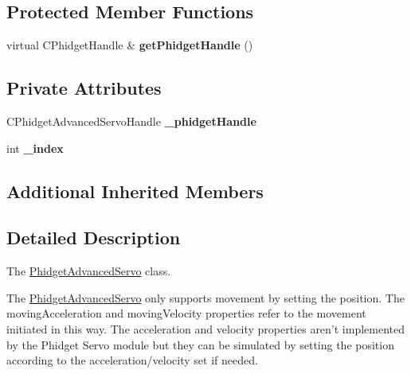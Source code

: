 \subsection*{Protected Member Functions}
\begin{DoxyCompactItemize}
\item 
\hypertarget{classdrobot_1_1device_1_1actuator_1_1PhidgetAdvancedServo_acdbdef2906b308868745f1d5d12559a2}{virtual C\-Phidget\-Handle \& {\bfseries get\-Phidget\-Handle} ()}\label{classdrobot_1_1device_1_1actuator_1_1PhidgetAdvancedServo_acdbdef2906b308868745f1d5d12559a2}

\end{DoxyCompactItemize}
\subsection*{Private Attributes}
\begin{DoxyCompactItemize}
\item 
\hypertarget{classdrobot_1_1device_1_1actuator_1_1PhidgetAdvancedServo_aafea126fddba6ac8b30846dbed780f08}{C\-Phidget\-Advanced\-Servo\-Handle {\bfseries \-\_\-phidget\-Handle}}\label{classdrobot_1_1device_1_1actuator_1_1PhidgetAdvancedServo_aafea126fddba6ac8b30846dbed780f08}

\item 
\hypertarget{classdrobot_1_1device_1_1actuator_1_1PhidgetAdvancedServo_ac89dae95063f7e05592b9e9534b3e6fd}{int {\bfseries \-\_\-index}}\label{classdrobot_1_1device_1_1actuator_1_1PhidgetAdvancedServo_ac89dae95063f7e05592b9e9534b3e6fd}

\end{DoxyCompactItemize}
\subsection*{Additional Inherited Members}


\subsection{Detailed Description}
The \hyperlink{classdrobot_1_1device_1_1actuator_1_1PhidgetAdvancedServo}{Phidget\-Advanced\-Servo} class. 

The \hyperlink{classdrobot_1_1device_1_1actuator_1_1PhidgetAdvancedServo}{Phidget\-Advanced\-Servo} only supports movement by setting the position. The moving\-Acceleration and moving\-Velocity properties refer to the movement initiated in this way. The acceleration and velocity properties aren't implemented by the Phidget Servo module but they can be simulated by setting the position according to the acceleration/velocity set if needed. 

